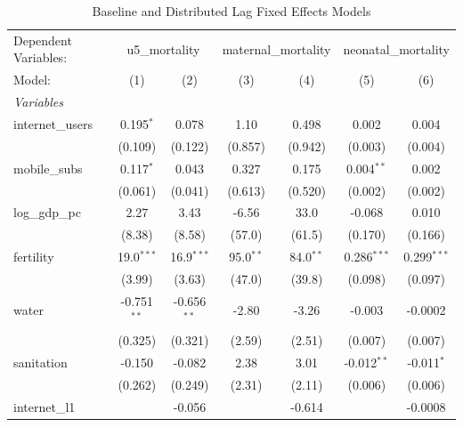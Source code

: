 \begin{table}[htbp]
   \caption{\label{tab:baseline_distributed_lag} Baseline and Distributed Lag Fixed Effects Models}
   \centering
   \begin{tabular}{lcccccc}
      \tabularnewline \midrule \midrule
      Dependent Variables: & \multicolumn{2}{c}{u5\_mortality} & \multicolumn{2}{c}{maternal\_mortality} & \multicolumn{2}{c}{neonatal\_mortality}\\
      Model:           & (1)           & (2)           & (3)         & (4)         & (5)           & (6)\\  
      \midrule
      \emph{Variables}\\
      internet\_users  & 0.195$^{*}$   & 0.078         & 1.10        & 0.498       & 0.002         & 0.004\\   
                       & (0.109)       & (0.122)       & (0.857)     & (0.942)     & (0.003)       & (0.004)\\   
      mobile\_subs     & 0.117$^{*}$   & 0.043         & 0.327       & 0.175       & 0.004$^{**}$  & 0.002\\   
                       & (0.061)       & (0.041)       & (0.613)     & (0.520)     & (0.002)       & (0.002)\\   
      log\_gdp\_pc     & 2.27          & 3.43          & -6.56       & 33.0        & -0.068        & 0.010\\   
                       & (8.38)        & (8.58)        & (57.0)      & (61.5)      & (0.170)       & (0.166)\\   
      fertility        & 19.0$^{***}$  & 16.9$^{***}$  & 95.0$^{**}$ & 84.0$^{**}$ & 0.286$^{***}$ & 0.299$^{***}$\\   
                       & (3.99)        & (3.63)        & (47.0)      & (39.8)      & (0.098)       & (0.097)\\   
      water            & -0.751$^{**}$ & -0.656$^{**}$ & -2.80       & -3.26       & -0.003        & -0.0002\\   
                       & (0.325)       & (0.321)       & (2.59)      & (2.51)      & (0.007)       & (0.007)\\   
      sanitation       & -0.150        & -0.082        & 2.38        & 3.01        & -0.012$^{**}$ & -0.011$^{*}$\\   
                       & (0.262)       & (0.249)       & (2.31)      & (2.11)      & (0.006)       & (0.006)\\   
      internet\_l1     &               & -0.056        &             & -0.614      &               & -0.0008\\   

\end{tabular}
\end{table}

